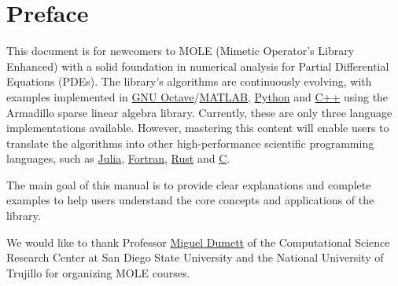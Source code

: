\chapter{Preface}

This document is for newcomers to MOLE (Mimetic Operator's
Library Enhanced) with a solid foundation in numerical analysis for
Partial Differential Equations (PDEs).
The library's algorithms are continuously evolving, with examples
implemented in
\href{https://octave.org}{GNU Octave}/\href{https://www.mathworks.com/products/matlab.html}{MATLAB},
\href{https://www.python.org}{Python} and
\href{https://isocpp.org}{C++} using the Armadillo sparse linear
algebra library.
Currently, these are only three language implementations available.
However, mastering this content will enable users to translate the
algorithms into other high-performance
scientific programming languages, such as
\href{https://julialang.org}{Julia},
\href{https://fortran-lang.org}{Fortran},
\href{https://www.rust-lang.org}{Rust} and
\href{https://www.open-std.org/jtc1/sc22/wg14}{C}.

The main goal of this manual is to provide clear explanations and
complete examples to help users understand the core
concepts and applications of the library.

We would like to thank Professor
\href{https://ctivitae.concytec.gob.pe/appDirectorioCTI/VerDatosInvestigador.do?id_investigador=45848}{Miguel Dumett}
of the Computational Science Research Center at San Diego State
University and the National University of Trujillo for organizing
MOLE courses.


